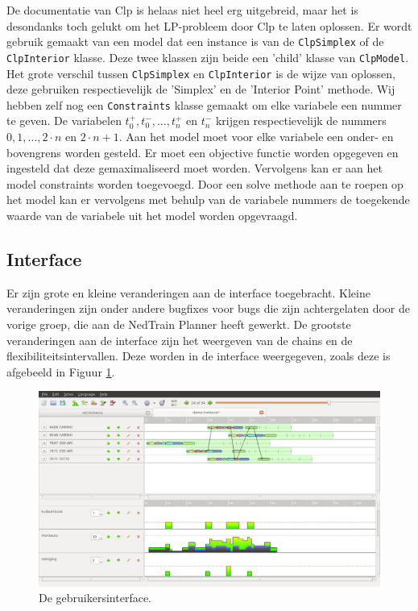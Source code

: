 De documentatie van Clp is helaas niet heel erg uitgebreid, maar het is desondanks toch gelukt om het LP-probleem door Clp te laten oplossen. Er wordt gebruik gemaakt van een model dat een instance is van de \texttt{ClpSimplex} of de \texttt{ClpInterior} klasse. Deze twee klassen zijn beide een 'child' klasse van \texttt{ClpModel}. Het grote verschil tussen \texttt{ClpSimplex} en \texttt{ClpInterior} is de wijze van oplossen, deze gebruiken respectievelijk de 'Simplex' en de 'Interior Point' methode. Wij hebben zelf nog een \texttt{Constraints} klasse gemaakt om elke variabele een nummer te geven. De variabelen $t^+_0, t^-_0, \ldots, t^+_n$ en $t^-_n$ krijgen respectievelijk de nummers $0, 1, \ldots, 2 \cdot n$ en $2 \cdot n + 1$. Aan het model moet voor elke variabele een onder- en bovengrens worden gesteld. Er moet een objective functie worden opgegeven en ingesteld dat deze gemaximaliseerd moet worden. Vervolgens kan er aan het model constraints worden toegevoegd. Door een solve methode aan te roepen op het model kan er vervolgens met behulp van de variabele nummers de toegekende waarde van de variabele uit het model worden opgevraagd. 

\subsection{Interface}
Er zijn grote en kleine veranderingen aan de interface toegebracht. Kleine veranderingen zijn onder andere bugfixes voor bugs die zijn achtergelaten door de vorige groep, die aan de NedTrain Planner heeft gewerkt. De grootste veranderingen aan de interface zijn het weergeven van de chains en de flexibiliteitsintervallen. Deze worden in de interface weergegeven, zoals deze is afgebeeld in Figuur \ref{fig:GUIfinal}.

\begin{figure}[H]
\centering
\includegraphics[width=.95\textwidth]{../images/GUIfinal.png}
\caption{De gebruikersinterface.}
\label{fig:GUIfinal}
\end{figure}

